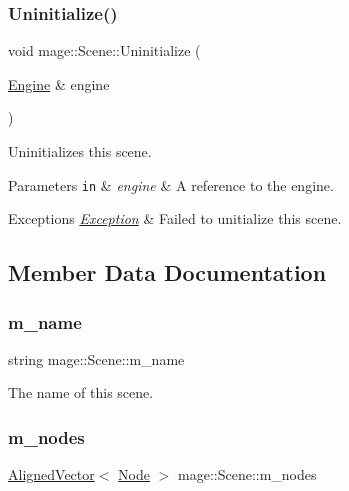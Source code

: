 \subsubsection{\texorpdfstring{Uninitialize()}{Uninitialize()}}
{\footnotesize\ttfamily void mage\+::\+Scene\+::\+Uninitialize (\begin{DoxyParamCaption}\item[{\mbox{\hyperlink{classmage_1_1_engine}{Engine}} \&}]{engine }\end{DoxyParamCaption})}

Uninitializes this scene.


\begin{DoxyParams}[1]{Parameters}
\mbox{\tt in}  & {\em engine} & A reference to the engine. \\
\hline
\end{DoxyParams}

\begin{DoxyExceptions}{Exceptions}
{\em \mbox{\hyperlink{classmage_1_1_exception}{Exception}}} & Failed to unitialize this scene. \\
\hline
\end{DoxyExceptions}


\subsection{Member Data Documentation}
\mbox{\label{classmage_1_1_scene_a6cc8cb08b1853c4e3063b33a94e8fb47}} 
\subsubsection{\texorpdfstring{m\+\_\+name}{m\_name}}
{\footnotesize\ttfamily string mage\+::\+Scene\+::m\+\_\+name\hspace{0.3cm}{\ttfamily [private]}}

The name of this scene. \mbox{\label{classmage_1_1_scene_a270ac4a26210b95ba05957af19c4c43c}} 
\subsubsection{\texorpdfstring{m\+\_\+nodes}{m\_nodes}}
{\footnotesize\ttfamily \mbox{\hyperlink{namespacemage_a8664bfb5ce2179fc64eae9f82c8a5ba8}{Aligned\+Vector}}$<$ \mbox{\hyperlink{classmage_1_1_node}{Node}} $>$ mage\+::\+Scene\+::m\+\_\+nodes\hspace{0.3cm}{\ttfamily [private]}}

